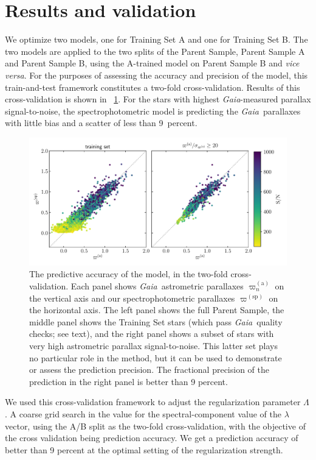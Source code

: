 \documentclass[modern]{aastex62}
\newcommand{\foreign}[1]{\textsl{#1}}
\newcommand{\project}[1]{\textsl{#1}}
\newcommand{\gaia}{\project{Gaia}}
\newcommand{\gparallax}{\varpi^{(\mathrm{a})}}
\newcommand{\sparallax}{\varpi^{(\mathrm{sp})}}
\begin{document}
\section{Results and validation}

We optimize two models, one for Training Set A and one for Training Set B.
The two models are applied to the two splits of the Parent Sample, Parent Sample
A and Parent Sample B, using the A-trained model on Parent Sample B and
\foreign{vice versa}.
For the purposes of assessing the accuracy and precision of the model, this
train-and-test framework constitutes a two-fold cross-validation.
Results of this cross-validation is shown in \figurename~\ref{fig:xval}.
For the stars with highest \gaia-measured parallax signal-to-noise,
the spectrophotometric model is predicting the \gaia\ parallaxes with little bias
and a scatter of less than 9~percent.
\begin{figure}
\includegraphics[width=\textwidth]{residuals.pdf}
\caption{The predictive accuracy of the model, in the two-fold cross-validation.
  Each panel shows \gaia\ astrometric parallaxes $\gparallax_n$ on the vertical axis
  and our spectrophotometric parallaxes $\sparallax$ on the horizontal axis.
  The left panel shows the full Parent Sample, the middle panel shows the Training Set
  stars (which pass \gaia\ quality checks; see text), and the right panel shows a
  subset of stars with very high astrometric parallax signal-to-noise. This latter
  set plays no particular role in the method, but it can be used to demonstrate or
  assess the prediction precision. The fractional precision of the prediction in the
  right panel is better than 9 percent.\label{fig:xval}}
\end{figure}

We used this cross-validation framework to adjust the regularization parameter $\Lambda$.
A coarse grid search in the value for the spectral-component value of the
$\lambda$ vector, using the A/B split as the two-fold cross-validation, with the objective
of the cross validation being prediction accuracy.
We get a prediction accuracy of better than 9 percent 
at the optimal setting of the regularization strength.
\end{document}
